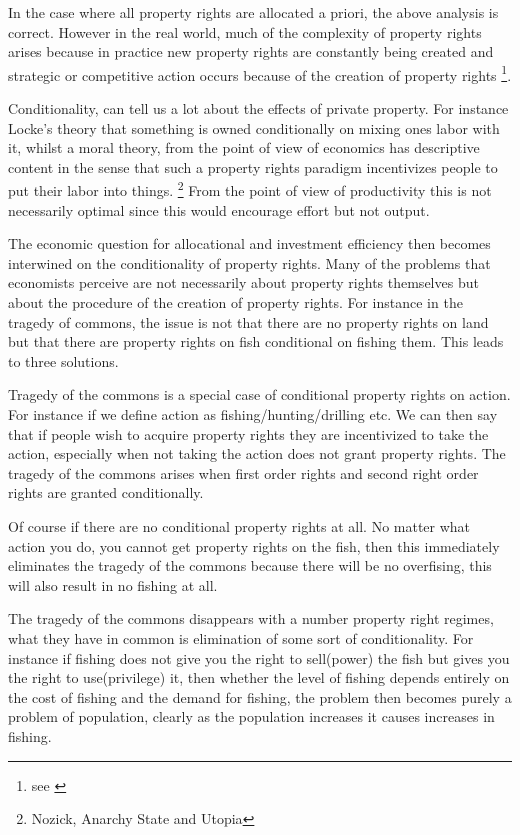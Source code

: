 \documentclass[12pt]{article}
\numberwithin{equation}{section}
\begin{document}
In the case where all property rights are allocated a priori, the above analysis is correct. However in the real world, much of the complexity of property rights arises because in practice new property rights are constantly being created and strategic or competitive action occurs because of the creation of property rights \footnote{see \cite{Alchian1973} }. 

Conditionality, can tell us a lot about the effects of private property. For instance Locke's theory that something is owned conditionally on mixing ones labor with it, whilst a moral theory, from the point of view of economics has descriptive content in the sense that such a property rights paradigm incentivizes people to put their labor into things. \footnote{Nozick, Anarchy State and Utopia} From the point of view of productivity this is not necessarily optimal since this would encourage effort but not output. 

The economic question for allocational and investment efficiency then becomes interwined on the conditionality of property rights. Many of the problems that economists perceive are not necessarily about property rights themselves but about the procedure of the creation of property rights. For instance in the tragedy of commons, the issue is not that there are no property rights on land but that there are property rights on fish conditional on fishing them. This leads to three solutions. 

Tragedy of the commons is a special case of conditional property rights on action. For instance if we define action as fishing/hunting/drilling etc. We can then say that if people wish to acquire property rights they are incentivized to take the action, especially when not taking the action does not grant property rights. The tragedy of the commons arises when first order rights and second right order rights are granted conditionally. 

Of course if there are no conditional property rights at all. No matter what action you do, you cannot get property rights on the fish, then this immediately eliminates the tragedy of the commons because there will be no overfising, this will also result in no fishing at all. 

The tragedy of the commons disappears with a number property right regimes, what they have in common is elimination of some sort of conditionality. For instance if fishing does not give you the right to sell(power) the fish but gives you the right to use(privilege) it, then whether the level of fishing depends entirely on the cost of fishing and the demand for fishing, the problem then becomes purely a problem of population, clearly as the population increases it causes increases in fishing. 
\end{document}
